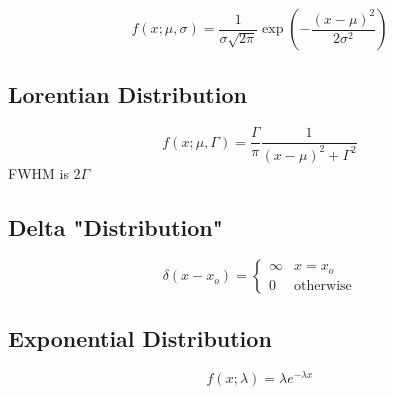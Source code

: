 \documentclass[11pt,a4paper]{book}
\newcommand{\imginput}[1]{} %
\begin{document}
			\begin{equation}
			\label{eq:Gaussian Distribution}
			f(x;\mu,\sigma) = \dfrac{1}{\sigma \sqrt{2\pi}} \exp{\left(-\frac{(x-\mu)^2}{2\sigma^2}\right)}
			\end{equation}
			
			\begin{figure} [!ht]
				\centering
				\def\svgwidth{\columnwidth}
				\resizebox{15cm}{!}{\imginput{images/Gaussian-Distribution-plots.pdf_tex}}
				\label{fig:Gaussian Distribution plots}
			\end{figure}
				
		\subsection{Lorentian Distribution}
			\label{subsec:Lorentian Distribution}
			
			\begin{figure} [!ht]
				\centering
				\def\svgwidth{\columnwidth}
				\resizebox{15cm}{!}{\imginput{images/lorentzian-distributions.pdf_tex}}
				\label{fig:lorentzian-distributions}
			\end{figure}
			
			\begin{equation}
			f(x;\mu, \Gamma)= \dfrac{\Gamma}{\pi} \dfrac{1}{(x-\mu)^2+\Gamma^2}
			\end{equation}
			FWHM is $2\Gamma$
			
		\subsection{Delta "Distribution"}
			\label{subsec:Delta "Distribution"}
			\begin{equation}
			\delta(x-x_o)=
			\begin{cases}{}
			\infty & x=x_o\\
			0 & \text{otherwise}
			\end{cases}
			\end{equation}
			\subsection{Exponential Distribution}
			\label{subsec:Exponential Distribution}
			\begin{equation}
			f(x;\lambda)= \lambda e^{-\lambda x}
			\end{equation}
\end{document}
